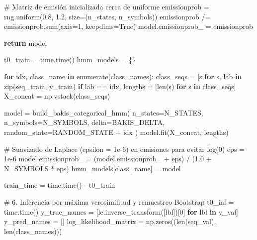 \documentclass[
  spanish,
  us-letterpaper,
]{scrreprt}
\newenvironment{Shaded}{\begin{snugshade}}{\end{snugshade}}
\newcommand{\BuiltInTok}[1]{\textcolor[rgb]{0.00,0.23,0.31}{#1}}
\newcommand{\CommentTok}[1]{\textcolor[rgb]{0.37,0.37,0.37}{#1}}
\newcommand{\ControlFlowTok}[1]{\textcolor[rgb]{0.00,0.23,0.31}{\textbf{#1}}}
\newcommand{\DecValTok}[1]{\textcolor[rgb]{0.68,0.00,0.00}{#1}}
\newcommand{\FloatTok}[1]{\textcolor[rgb]{0.68,0.00,0.00}{#1}}
\newcommand{\KeywordTok}[1]{\textcolor[rgb]{0.00,0.23,0.31}{\textbf{#1}}}
\newcommand{\NormalTok}[1]{\textcolor[rgb]{0.00,0.23,0.31}{#1}}
\newcommand{\OperatorTok}[1]{\textcolor[rgb]{0.37,0.37,0.37}{#1}}
\newcommand{\VariableTok}[1]{\textcolor[rgb]{0.07,0.07,0.07}{#1}}
\theoremstyle{definition}
\theoremstyle{remark}
\begin{document}
\begin{Shaded}
\begin{Highlighting}[]
    \CommentTok{\# Matriz de emisión inicializada cerca de uniforme}
\NormalTok{    emissionprob }\OperatorTok{=}\NormalTok{ rng.uniform(}\FloatTok{0.8}\NormalTok{, }\FloatTok{1.2}\NormalTok{, size}\OperatorTok{=}\NormalTok{(n\_states, n\_symbols))}
\NormalTok{    emissionprob }\OperatorTok{/=}\NormalTok{ emissionprob.}\BuiltInTok{sum}\NormalTok{(axis}\OperatorTok{=}\DecValTok{1}\NormalTok{, keepdims}\OperatorTok{=}\VariableTok{True}\NormalTok{)}
\NormalTok{    model.emissionprob\_ }\OperatorTok{=}\NormalTok{ emissionprob}

    \ControlFlowTok{return}\NormalTok{ model}

\NormalTok{t0\_train }\OperatorTok{=}\NormalTok{ time.time()}
\NormalTok{hmm\_models }\OperatorTok{=}\NormalTok{ \{\}}

\ControlFlowTok{for}\NormalTok{ idx, class\_name }\KeywordTok{in} \BuiltInTok{enumerate}\NormalTok{(class\_names):}
\NormalTok{    class\_seqs }\OperatorTok{=}\NormalTok{ [s }\ControlFlowTok{for}\NormalTok{ s, lab }\KeywordTok{in} \BuiltInTok{zip}\NormalTok{(seq\_train, y\_train) }\ControlFlowTok{if}\NormalTok{ lab }\OperatorTok{==}\NormalTok{ idx]}
\NormalTok{    lengths }\OperatorTok{=}\NormalTok{ [}\BuiltInTok{len}\NormalTok{(s) }\ControlFlowTok{for}\NormalTok{ s }\KeywordTok{in}\NormalTok{ class\_seqs]}
\NormalTok{    X\_concat }\OperatorTok{=}\NormalTok{ np.vstack(class\_seqs)}

\NormalTok{    model }\OperatorTok{=}\NormalTok{ build\_bakis\_categorical\_hmm(}
\NormalTok{        n\_states}\OperatorTok{=}\NormalTok{N\_STATES,}
\NormalTok{        n\_symbols}\OperatorTok{=}\NormalTok{N\_SYMBOLS,}
\NormalTok{        delta}\OperatorTok{=}\NormalTok{BAKIS\_DELTA,}
\NormalTok{        random\_state}\OperatorTok{=}\NormalTok{RANDOM\_STATE }\OperatorTok{+}\NormalTok{ idx}
\NormalTok{    )}
\NormalTok{    model.fit(X\_concat, lengths)}

    \CommentTok{\# Suavizado de Laplace (epsilon = 1e{-}6) en emisiones para evitar log(0)}
\NormalTok{    eps }\OperatorTok{=} \FloatTok{1e{-}6}
\NormalTok{    model.emissionprob\_ }\OperatorTok{=}\NormalTok{ (model.emissionprob\_ }\OperatorTok{+}\NormalTok{ eps) }\OperatorTok{/}\NormalTok{ (}\FloatTok{1.0} \OperatorTok{+}\NormalTok{ N\_SYMBOLS }\OperatorTok{*}\NormalTok{ eps)}
\NormalTok{    hmm\_models[class\_name] }\OperatorTok{=}\NormalTok{ model}

\NormalTok{train\_time }\OperatorTok{=}\NormalTok{ time.time() }\OperatorTok{{-}}\NormalTok{ t0\_train}

\CommentTok{\# 6. Inferencia por máxima verosimilitud y remuestreo Bootstrap}
\NormalTok{t0\_inf }\OperatorTok{=}\NormalTok{ time.time()}
\NormalTok{y\_true\_names }\OperatorTok{=}\NormalTok{ [le.inverse\_transform([lbl])[}\DecValTok{0}\NormalTok{] }\ControlFlowTok{for}\NormalTok{ lbl }\KeywordTok{in}\NormalTok{ y\_val]}
\NormalTok{y\_pred\_names }\OperatorTok{=}\NormalTok{ []}
\NormalTok{log\_likelihood\_matrix }\OperatorTok{=}\NormalTok{ np.zeros((}\BuiltInTok{len}\NormalTok{(seq\_val), }\BuiltInTok{len}\NormalTok{(class\_names)))}


\end{Highlighting}
\end{Shaded}
\end{document}
